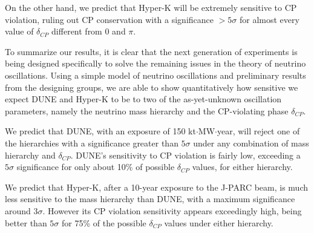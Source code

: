 On the other hand, we predict that Hyper-K will be extremely sensitive to CP
violation, ruling out CP conservation with a significance $>5\sigma$ for almost
every value of $\delta_{CP}$ different from $0$ and $\pi$.

To summarize our results, it is clear that the next generation of experiments
is being designed specifically to solve the remaining issues in the theory of
neutrino oscillations. Using a simple model of neutrino oscillations and
preliminary results from the designing groups, we are able to show
quantitatively how sensitive we expect DUNE and Hyper-K to be to two of the
as-yet-unknown oscillation parameters, namely the neutrino mass hierarchy and
the CP-violating phase $\delta_{CP}$.

We predict that DUNE, with an exposure of 150 kt$\cdot$MW$\cdot$year, will
reject one of the hierarchies with a significance greater than $5\sigma$ under
any combination of mass hierarchy and $\delta_{CP}$. DUNE's sensitivity to CP
violation is fairly low, exceeding a $5\sigma$ significance for only about 10\% 
of possible $\delta_{CP}$ values, for either hierarchy.

We predict that Hyper-K, after a 10-year exposure to the J-PARC beam, is
much less sensitive to the mass hierarchy than DUNE, with a maximum
significance around $3\sigma$. However its CP violation sensitivity appears
exceedingly high, being better than $5\sigma$ for 75\% of the possible
$\delta_{CP}$ values under either hierarchy.




